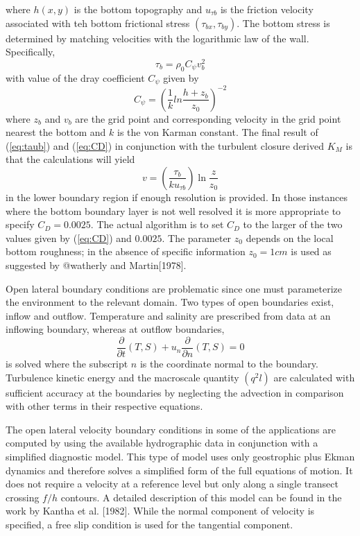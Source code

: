 \documentclass[oribibl]{llncs}
\begin{document}
where $h(x,y)$ is the bottom topography and $u_{\tau b}$ is the friction velocity associated with teh bottom frictional stress $(\tau_{bx}, \tau_{by})$. The bottom stress is determined by matching velocities with the logarithmic law of the wall. Specifically,
\begin{equation} 
\tau_b=\rho_0 C_\psi v_b^2 \label{eq:taub}
\end{equation}
with value of the dray coefficient $C_\psi$ given by
\begin{equation}
C_\psi= \left( \frac{1}{k} ln \frac{h+z_b}{z_0} \right)^{-2} \label{eq:CD}
\end{equation}
where $z_b$ and $v_b$ are the grid point and corresponding velocity in the grid point nearest the bottom and $k$ is the von Karman constant. The final result of (\ref{eq:taub}) and (\ref{eq:CD}) in conjunction with the turbulent closure derived $K_M$ is that the calculations will yield
\begin{equation}
v= \left( \frac{\tau_b}{k u_{\tau b}} \right)  \ln \frac{z}{z_0} \label{eq:v}
\end{equation}
 in the lower boundary region if enough resolution is provided. In those instances where the bottom boundary layer is not well resolved it is more appropriate to specify $C_D=0.0025$. The actual algorithm is to set $C_D$ to the larger of the two values given by  (\ref{eq:CD}) and $0.0025$. The parameter $z_0$ depends on the local bottom roughness; in the absence of specific information $z_0=1 cm$ is used as suggested by @watherly and Martin[1978].
 
Open lateral boundary conditions are problematic since one must parameterize the environment to the relevant domain. Two types of open boundaries exist, inflow and outflow. Temperature and salinity are prescribed from data at an inflowing boundary, whereas at outflow boundaries,
 \begin{equation}
 \frac{\partial}{\partial t}(T, S) + u_n \frac{\partial}{\partial n} (T, S) =0
 \end{equation}
 is solved where the subscript $n$ is the coordinate normal to the boundary. Turbulence kinetic energy and the macroscale quantity $(q^2l)$ are calculated with sufficient accuracy at the boundaries by neglecting the advection in comparison with other terms in their respective equations.
 
 The open lateral velocity boundary conditions in some of the applications  are computed by using the available hydrographic data in conjunction with a simplified diagnostic model. This type of model uses only geostrophic plus Ekman dynamics and therefore solves a simplified form of the full equations of motion. It does not require a velocity at a reference level but only along a single transect crossing $f/h$ contours. A detailed description of this model can be found in the work by Kantha et al. [1982]. While the normal component of velocity is specified, a free slip condition is used for the tangential component.
 
\end{document}
